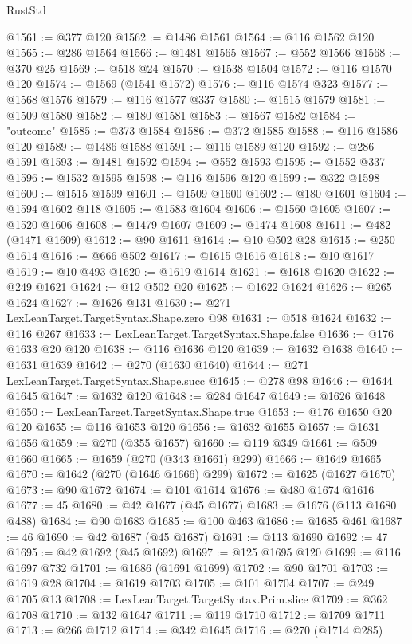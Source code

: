 \begin{lexlean}{RustStd}
\begin{coremodule}
@1561 := @377 @120
@1562 := @1486 @1561
@1564 := @116 @1562 @120
@1565 := @286 @1564
@1566 := @1481 @1565
@1567 := @552 @1566
@1568 := @370 @25
@1569 := @518 @24
@1570 := @1538 @1504
@1572 := @116 @1570 @120
@1574 := @1569 (@1541 @1572)
@1576 := @116 @1574 @323
@1577 := @1568 @1576
@1579 := @116 @1577 @337
@1580 := @1515 @1579
@1581 := @1509 @1580
@1582 := @180 @1581
@1583 := @1567 @1582
@1584 := "outcome"
@1585 := @373 @1584
@1586 := @372 @1585
@1588 := @116 @1586 @120
@1589 := @1486 @1588
@1591 := @116 @1589 @120
@1592 := @286 @1591
@1593 := @1481 @1592
@1594 := @552 @1593
@1595 := @1552 @337
@1596 := @1532 @1595
@1598 := @116 @1596 @120
@1599 := @322 @1598
@1600 := @1515 @1599
@1601 := @1509 @1600
@1602 := @180 @1601
@1604 := @1594 @1602 @118
@1605 := @1583 @1604
@1606 := @1560 @1605
@1607 := @1520 @1606
@1608 := @1479 @1607
@1609 := @1474 @1608
@1611 := @482 (@1471 @1609)
@1612 := @90 @1611
@1614 := @10 @502 @28
@1615 := @250 @1614
@1616 := @666 @502
@1617 := @1615 @1616
@1618 := @10 @1617
@1619 := @10 @493
@1620 := @1619 @1614
@1621 := @1618 @1620
@1622 := @249 @1621
@1624 := @12 @502 @20
@1625 := @1622 @1624
@1626 := @265 @1624
@1627 := @1626 @131
@1630 := @271 LexLeanTarget.TargetSyntax.Shape.zero @98
@1631 := @518 @1624
@1632 := @116 @267
@1633 := LexLeanTarget.TargetSyntax.Shape.false
@1636 := @176 @1633 @20 @120
@1638 := @116 @1636 @120
@1639 := @1632 @1638
@1640 := @1631 @1639
@1642 := @270 (@1630 @1640)
@1644 := @271 LexLeanTarget.TargetSyntax.Shape.succ
@1645 := @278 @98
@1646 := @1644 @1645
@1647 := @1632 @120
@1648 := @284 @1647
@1649 := @1626 @1648
@1650 := LexLeanTarget.TargetSyntax.Shape.true
@1653 := @176 @1650 @20 @120
@1655 := @116 @1653 @120
@1656 := @1632 @1655
@1657 := @1631 @1656
@1659 := @270 (@355 @1657)
@1660 := @119 @349
@1661 := @509 @1660
@1665 := @1659 (@270 (@343 @1661) @299)
@1666 := @1649 @1665
@1670 := @1642 (@270 (@1646 @1666) @299)
@1672 := @1625 (@1627 @1670)
@1673 := @90 @1672
@1674 := @101 @1614
@1676 := @480 @1674 @1616
@1677 := 45
@1680 := @42 @1677 (@45 @1677)
@1683 := @1676 (@113 @1680 @488)
@1684 := @90 @1683
@1685 := @100 @463
@1686 := @1685 @461
@1687 := 46
@1690 := @42 @1687 (@45 @1687)
@1691 := @113 @1690
@1692 := 47
@1695 := @42 @1692 (@45 @1692)
@1697 := @125 @1695 @120
@1699 := @116 @1697 @732
@1701 := @1686 (@1691 @1699)
@1702 := @90 @1701
@1703 := @1619 @28
@1704 := @1619 @1703
@1705 := @101 @1704
@1707 := @249 @1705 @13
@1708 := LexLeanTarget.TargetSyntax.Prim.slice
@1709 := @362 @1708
@1710 := @132 @1647
@1711 := @119 @1710
@1712 := @1709 @1711
@1713 := @266 @1712
@1714 := @342 @1645
@1716 := @270 (@1714 @285)

\end{coremodule}
\end{lexlean}
